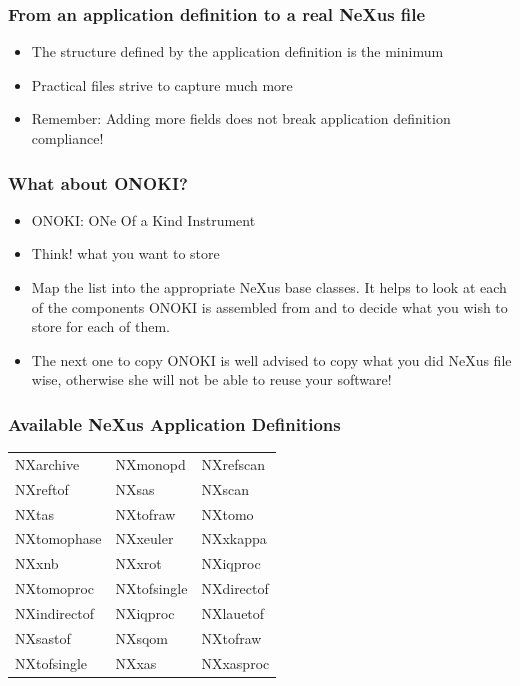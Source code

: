 \documentclass{beamer}
\newcommand{\changefont}[3] {
 \fontfamily{#1} \fontseries{#2} \fontshape{#3} \selectfont}
\begin{document}
\begin{frame}
\frametitle{From an application definition to a real NeXus file}
\begin{itemize}
\item<1->The structure defined by the application definition is the minimum
\item<2->Practical files strive to capture much more
\item<4-> Remember: {\color{red}Adding more fields does not break application definition compliance!} 
\end{itemize}
\end{frame}

\begin{frame} \frametitle{What about ONOKI?}
\begin{itemize}
\item<1->ONOKI: ONe Of a Kind Instrument
\item<2->{\color{blue}Think!} what you want to store
\item<3->{\color{blue}Map} the list into the appropriate NeXus base classes. It helps to 
 look at each of the components ONOKI is assembled from and to decide what you wish 
 to store for each of them. 
\item<4->The next one to copy ONOKI is well advised to copy what you did NeXus file wise, 
 otherwise she will not be able to reuse your software!
\end{itemize}
\end{frame}

\begin{frame} \frametitle{Available NeXus Application Definitions}
{\changefont{cmr}{bx}{sc} 
\begin{tabular}{lll}
NXarchive& NXmonopd & NXrefscan \\
NXreftof & NXsas & NXscan \\
NXtas & NXtofraw& NXtomo\\
NXtomophase & NXxeuler & NXxkappa\\
NXxnb & NXxrot & NXiqproc \\
NXtomoproc & NXtofsingle& NXdirectof\\
NXindirectof & NXiqproc& NXlauetof\\
NXsastof& NXsqom& NXtofraw\\
NXtofsingle& NXxas& NXxasproc\\
\end{tabular}
}
\end{frame}
\end{document}
